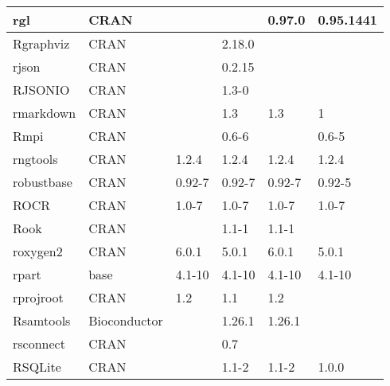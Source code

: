 \begin{longtable}{@{\extracolsep{\fill}}|l|l|l|l|l|l|@{}}
rgl                           & CRAN                      &             &             & 0.97.0         & 0.95.1441        \\ \hline
Rgraphviz                     & CRAN                      &             & 2.18.0      &                &                  \\ \hline
rjson                         & CRAN                      &             & 0.2.15      &                &                  \\ \hline
RJSONIO                       & CRAN                      &             & 1.3-0       &                &                  \\ \hline
rmarkdown                     & CRAN                      &             & 1.3         & 1.3            & 1                \\ \hline
Rmpi                          & CRAN                      &             & 0.6-6       &                & 0.6-5            \\ \hline
rngtools                      & CRAN                      & 1.2.4       & 1.2.4       & 1.2.4          & 1.2.4            \\ \hline
robustbase                    & CRAN                      & 0.92-7      & 0.92-7      & 0.92-7         & 0.92-5           \\ \hline
ROCR                          & CRAN                      & 1.0-7       & 1.0-7       & 1.0-7          & 1.0-7            \\ \hline
Rook                          & CRAN                      &             & 1.1-1       & 1.1-1          &                  \\ \hline
roxygen2                      & CRAN                      & 6.0.1       & 5.0.1       & 6.0.1          & 5.0.1            \\ \hline
rpart                         & base                      & 4.1-10      & 4.1-10      & 4.1-10         & 4.1-10           \\ \hline
rprojroot                     & CRAN                      & 1.2         & 1.1         & 1.2            &                  \\ \hline
Rsamtools                     & Bioconductor              &             & 1.26.1      & 1.26.1         &                  \\ \hline
rsconnect                     & CRAN                      &             & 0.7         &                &                  \\ \hline
RSQLite                       & CRAN                      &             & 1.1-2       & 1.1-2          & 1.0.0            \\ \hline

\end{longtable}
